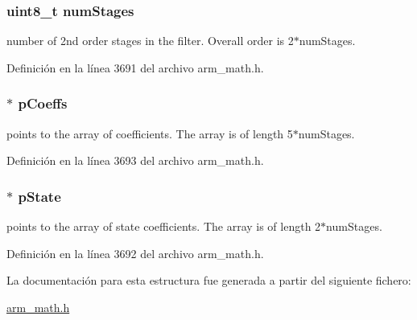 \subsubsection[{\texorpdfstring{num\+Stages}{numStages}}]{\setlength{\rightskip}{0pt plus 5cm}uint8\+\_\+t num\+Stages}\hypertarget{structarm__biquad__cascade__df2_t__instance__f32_a3615af038f56917909e0370c11bc2ec7}{}\label{structarm__biquad__cascade__df2_t__instance__f32_a3615af038f56917909e0370c11bc2ec7}
number of 2nd order stages in the filter. Overall order is 2$\ast$num\+Stages. 

Definición en la línea 3691 del archivo arm\+\_\+math.\+h.

\subsubsection[{\texorpdfstring{p\+Coeffs}{pCoeffs}}]{$\ast$ p\+Coeffs}\hypertarget{structarm__biquad__cascade__df2_t__instance__f32_aacbb8dd8eeba4b21fc2bb40076405ee3}{}\label{structarm__biquad__cascade__df2_t__instance__f32_aacbb8dd8eeba4b21fc2bb40076405ee3}
points to the array of coefficients. The array is of length 5$\ast$num\+Stages. 

Definición en la línea 3693 del archivo arm\+\_\+math.\+h.

\subsubsection[{\texorpdfstring{p\+State}{pState}}]{$\ast$ p\+State}\hypertarget{structarm__biquad__cascade__df2_t__instance__f32_a335c87e6fdc4b96601d95a5de8b9c463}{}\label{structarm__biquad__cascade__df2_t__instance__f32_a335c87e6fdc4b96601d95a5de8b9c463}
points to the array of state coefficients. The array is of length 2$\ast$num\+Stages. 

Definición en la línea 3692 del archivo arm\+\_\+math.\+h.



La documentación para esta estructura fue generada a partir del siguiente fichero\+:\begin{DoxyCompactItemize}
\item 
\hyperlink{arm__math_8h}{arm\+\_\+math.\+h}\end{DoxyCompactItemize}
